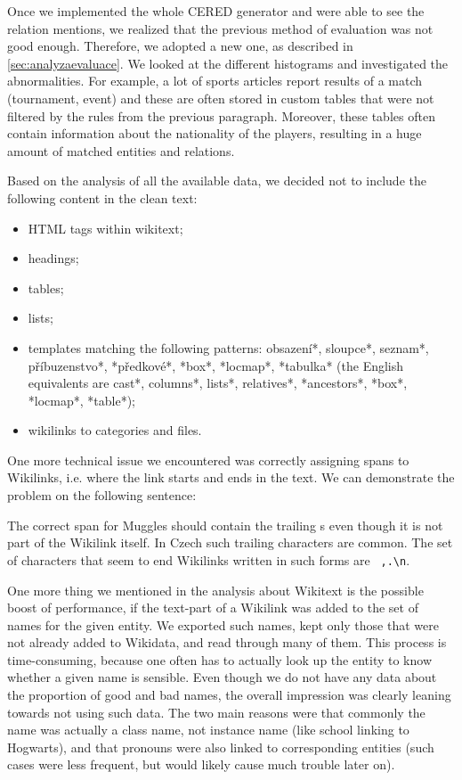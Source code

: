 Once we implemented the whole CERED generator and were able to see the relation mentions, we realized that the previous method of evaluation was not good enough. Therefore, we adopted a new one, as described in \autoref{sec:analyzaevaluace}. We looked at the different histograms and investigated the abnormalities. For example, a lot of sports articles report results of a match (tournament, event) and these are often stored in custom tables that were not filtered by the rules from the previous paragraph. Moreover, these tables often contain information about the nationality of the players, resulting in a huge amount of matched entities and relations.

Based on the analysis of all the available data, we decided not to include the following content in the clean text:
\begin{itemize}

\item HTML tags within wikitext;
\item headings;
\item tables;
\item lists;
\item templates matching the following patterns: obsazení*, sloupce*, seznam*, příbuzenstvo*, *předkové*, *box*, *locmap*, *tabulka* (the English equivalents are cast*, columns*, lists*, relatives*, *ancestors*, *box*, *locmap*, *table*);
\item wikilinks to categories and files.

\end{itemize}

One more technical issue we encountered was correctly assigning spans to Wikilinks, i.e. where the link starts and ends in the text. We can demonstrate the problem on the  following sentence: 
\begin{quote}
\end{quote}
 The correct span for Muggles should contain the trailing s even though it is not part of the Wikilink itself. In Czech such trailing characters are common. The set of characters that seem to end Wikilinks written in such forms are \verb*| ,.\n|.

One more thing we mentioned in the analysis about Wikitext is the possible boost of performance, if the text-part of a Wikilink was added to the set of names for the given entity. We exported such names, kept only those that were not already added to Wikidata, and read through many of them. This process is time-consuming, because one often has to actually look up the entity to know whether a given name is sensible. Even though we do not have any data about the proportion of good and bad names, the overall impression was clearly leaning towards not using such data. The two main reasons were that commonly the name was actually a class name, not instance name (like school linking to Hogwarts), and that pronouns were also linked to corresponding entities (such cases were less frequent, but would likely cause much trouble later on). 

